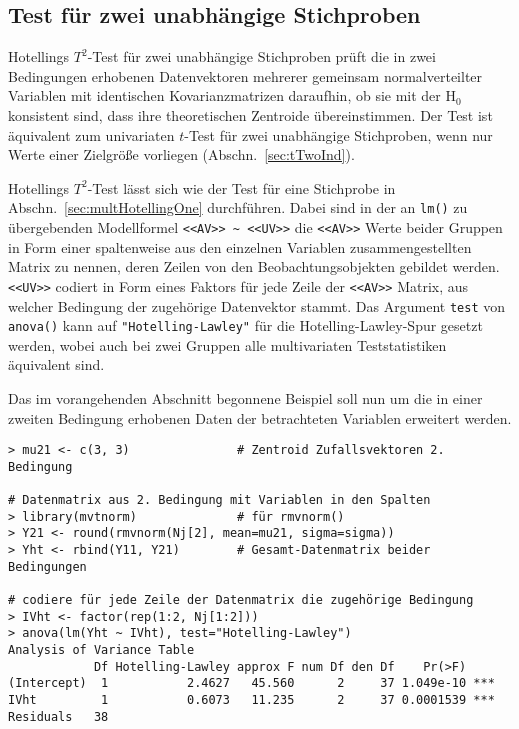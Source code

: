 \subsection{Test für zwei unabhängige Stichproben}
\label{sec:multHotellingTwoInd}

Hotellings $T^{2}$-Test für zwei unabhängige Stichproben prüft die in zwei Bedingungen erhobenen Datenvektoren mehrerer gemeinsam normalverteilter Variablen mit identischen Kovarianzmatrizen daraufhin, ob sie mit der $\text{H}_{0}$ konsistent sind, dass ihre theoretischen Zentroide übereinstimmen. Der Test ist äquivalent zum univariaten $t$-Test für zwei unabhängige Stichproben, wenn nur Werte einer Zielgröße vorliegen (Abschn.\ \ref{sec:tTwoInd}).

Hotellings $T^{2}$-Test lässt sich wie der Test für eine Stichprobe in Abschn.\ \ref{sec:multHotellingOne} durchführen. Dabei sind in der an \lstinline!lm()! zu übergebenden Modellformel \lstinline!<<AV>> ~ <<UV>>! die \lstinline!<<AV>>! Werte beider Gruppen in Form einer spaltenweise aus den einzelnen Variablen zusammengestellten Matrix zu nennen, deren Zeilen von den Beobachtungsobjekten gebildet werden. \lstinline!<<UV>>! codiert in Form eines Faktors für jede Zeile der \lstinline!<<AV>>! Matrix, aus welcher Bedingung der zugehörige Datenvektor stammt. Das Argument \lstinline!test! von \lstinline!anova()! kann auf \lstinline!"Hotelling-Lawley"! für die Hotelling-Lawley-Spur gesetzt werden, wobei auch bei zwei Gruppen alle multivariaten Teststatistiken äquivalent sind.

Das im vorangehenden Abschnitt begonnene Beispiel soll nun um die in einer zweiten Bedingung erhobenen Daten der betrachteten Variablen erweitert werden.
\begin{lstlisting}
> mu21 <- c(3, 3)               # Zentroid Zufallsvektoren 2. Bedingung

# Datenmatrix aus 2. Bedingung mit Variablen in den Spalten
> library(mvtnorm)              # für rmvnorm()
> Y21 <- round(rmvnorm(Nj[2], mean=mu21, sigma=sigma))
> Yht <- rbind(Y11, Y21)        # Gesamt-Datenmatrix beider Bedingungen

# codiere für jede Zeile der Datenmatrix die zugehörige Bedingung
> IVht <- factor(rep(1:2, Nj[1:2]))
> anova(lm(Yht ~ IVht), test="Hotelling-Lawley")
Analysis of Variance Table
            Df Hotelling-Lawley approx F num Df den Df    Pr(>F)
(Intercept)  1           2.4627   45.560      2     37 1.049e-10 ***
IVht         1           0.6073   11.235      2     37 0.0001539 ***
Residuals   38
\end{lstlisting}

